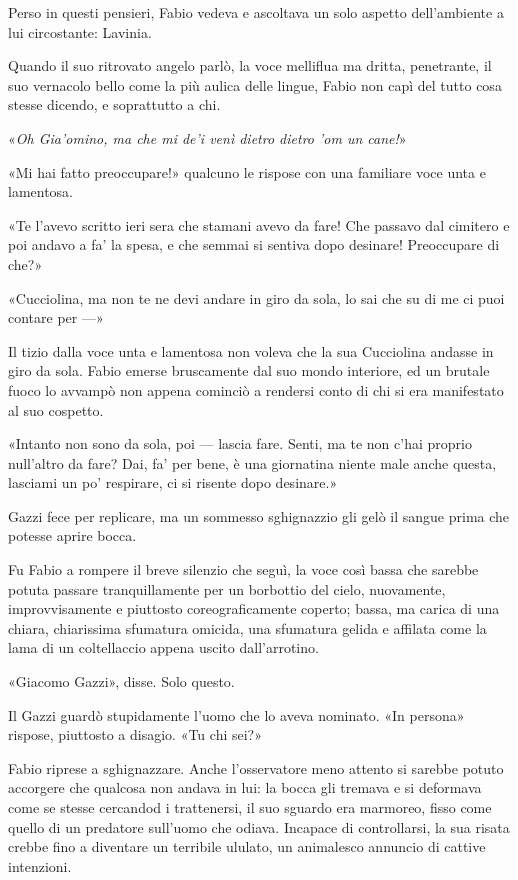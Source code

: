 Perso in questi pensieri, Fabio vedeva e ascoltava un solo aspetto dell'ambiente a lui circostante: Lavinia.

Quando il suo ritrovato angelo parlò, la voce melliflua ma dritta, penetrante, il suo vernacolo bello come la più aulica delle lingue, Fabio non capì del tutto cosa stesse dicendo, e soprattutto a chi.

«\emph{Oh Gia'omino, ma che mi de'i venì dietro dietro 'om un cane!}»

«Mi hai fatto preoccupare!» qualcuno le rispose con una familiare voce unta e lamentosa.

«Te l'avevo scritto ieri sera che stamani avevo da fare! Che passavo dal cimitero e poi andavo a fa' la spesa, e che semmai si sentiva dopo desinare! Preoccupare di che?»

«Cucciolina, ma non te ne devi andare in giro da sola, lo sai che su di me ci puoi contare per ---»

Il tizio dalla voce unta e lamentosa non voleva che la sua Cucciolina andasse in giro da sola. Fabio emerse bruscamente dal suo mondo interiore, ed un brutale fuoco lo avvampò non appena cominciò a rendersi conto di chi si era manifestato al suo cospetto.

«Intanto non sono da sola, poi --- lascia fare. Senti, ma te non c'hai proprio null'altro da fare? Dai, fa' per bene, è una giornatina niente male anche questa, lasciami un po' respirare, ci si risente dopo desinare.»

Gazzi fece per replicare, ma un sommesso sghignazzio gli gelò il sangue prima che potesse aprire bocca.

Fu Fabio a rompere il breve silenzio che seguì, la voce così bassa che sarebbe potuta passare tranquillamente per un borbottio del cielo, nuovamente, improvvisamente e piuttosto coreograficamente coperto; bassa, ma carica di una chiara, chiarissima sfumatura omicida, una sfumatura gelida e affilata come la lama di un coltellaccio appena uscito dall'arrotino.

«Giacomo Gazzi», disse. Solo questo.

Il Gazzi guardò stupidamente l'uomo che lo aveva nominato. «In persona» rispose, piuttosto a disagio. «Tu chi sei?»

Fabio riprese a sghignazzare. Anche l'osservatore meno attento si sarebbe potuto accorgere che qualcosa non andava in lui: la bocca gli tremava e si deformava come se stesse cercandod i trattenersi, il suo sguardo era marmoreo, fisso come quello di un predatore sull'uomo che odiava. Incapace di controllarsi, la sua risata crebbe fino a diventare un terribile ululato, un animalesco annuncio di cattive intenzioni.

